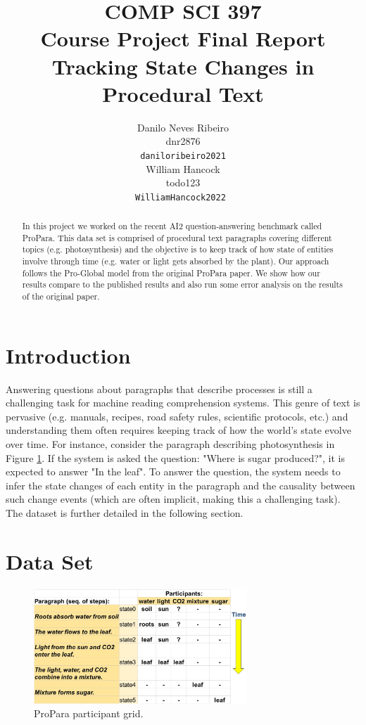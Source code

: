 \documentclass[11pt,a4paper]{article}
\title{COMP SCI 397 \\
    Course Project Final Report \\
    Tracking State Changes in Procedural Text}
\author{Danilo Neves Ribeiro \\
  dnr2876 \\
  {\tt daniloribeiro2021} \\\And
  William Hancock \\
  todo123 \\
  {\tt WilliamHancock2022 } \\}
\date{}
\begin{document}
\maketitle
\begin{abstract}
  In this project we worked on the recent AI2 question-answering 
  benchmark called ProPara. This data set is comprised of procedural 
  text paragraphs covering different topics (e.g. photosynthesis) and 
  the objective is to keep track of how state of entities involve through 
  time (e.g. water or light gets absorbed by the plant). Our approach 
  follows the Pro-Global model from the original ProPara paper. We 
  show how our results compare to the published results and also 
  run some error analysis on the results of the original paper.
\end{abstract}

\section{Introduction}

Answering questions about paragraphs that describe processes is still 
a challenging task for machine reading comprehension systems. This 
genre of text is pervasive (e.g. manuals, recipes, road safety rules, 
scientific protocols, etc.) and understanding them often requires 
keeping track of how the world’s state evolve over time. For instance, 
consider the paragraph describing photosynthesis in Figure 
\ref{fig:participant-grid}. If the system is asked the question: 
"Where is sugar produced?", it is expected to answer "In the leaf". 
To answer the question, the system needs to infer the state changes 
of each entity in the paragraph and the causality between such change 
events (which are often implicit, making this a challenging task). The 
dataset is further detailed in the following section.

\section{Data Set}

\begin{figure}[h]
\includegraphics[width=8cm]{participant-grid-simple.JPG}
\caption{ProPara participant grid.}
\label{fig:participant-grid}
\end{figure}
\end{document}
